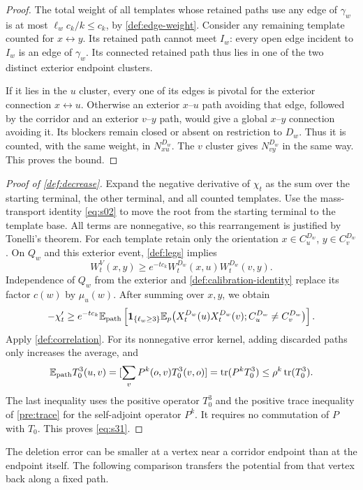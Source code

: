 \begin{proof}
The total weight of all templates whose retained paths use any edge of
$\gamma_w$ is at most $\ell_wc_k/k\le c_k$, by
\eqref{def:edge-weight}.  Consider any remaining template counted for
$x\leftrightarrow y$.  Its retained path cannot meet $I_w$: every open edge
incident to $I_w$ is an edge of $\gamma_w$.  Its connected retained path
thus lies in one of the two distinct exterior endpoint clusters.

If it lies in the $u$ cluster, every one of its edges is pivotal for the
exterior connection $x\leftrightarrow u$.  Otherwise an exterior
$x$--$u$ path avoiding that edge, followed by the corridor and an exterior
$v$--$y$ path, would give a global $x$--$y$ connection avoiding it.  Its
blockers remain closed or absent on restriction to $D_w$.  Thus it is
counted, with the same weight, in $N^{D_w}_{xu}$.  The $v$ cluster gives
$N^{D_w}_{vy}$ in the same way.  This proves the bound.
\end{proof}

\begin{proof}[Proof of \cref{def:decrease}]
Expand the negative derivative of $\chi_t$ as the sum over the starting
terminal, the other terminal, and all counted templates.  Use the
mass-transport identity \eqref{eq:s02} to move the root from the starting
terminal to the template base.  All terms are nonnegative, so this
rearrangement is justified by Tonelli's theorem.  For each template retain
only the orientation $x\in C_u^{D_w}$, $y\in C_v^{D_w}$.
On $Q_w$ and this exterior event, \cref{def:legs} implies
\[
 W_t^V(x,y)\ge
 e^{-tc_k}W_t^{D_w}(x,u)W_t^{D_w}(v,y).
\]
Independence of $Q_w$ from the exterior and
\eqref{def:calibration-identity} replace its factor $c(w)$ by $\mu_u(w)$.
After summing over $x,y$, we obtain
\[
 -\chi_t'\ge e^{-tc_k}\mathbb E_{\rm path}\left[
 \mathbf 1_{\{\ell_w\ge3\}}
 \mathbb E_p\bigl(X_t^{D_w}(u)X_t^{D_w}(v);
           C_u^{D_w}\ne C_v^{D_w}\bigr)\right].
\]
Apply \cref{def:correlation}.  For its nonnegative error kernel, adding
discarded paths only increases the average, and
\[
 \mathbb E_{\rm path}T_0^3(u,v)
 =[\sum_v P^k(o,v)T_0^3(v,o)]
 =\operatorname{tr}(P^kT_0^3)\le\rho^k\operatorname{tr}(T_0^3).
\]
The last inequality uses the positive operator $T_0^3$ and the positive
trace inequality of \cref{pre:trace} for the self-adjoint operator $P^k$.  It requires no
commutation of $P$ with $T_0$.  This proves \eqref{eq:s31}.
\end{proof}

The deletion error can be smaller at a vertex near a corridor endpoint
than at the endpoint itself. The following comparison transfers the
potential from that vertex back along a fixed path.

